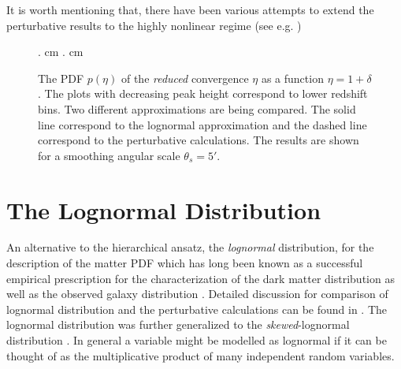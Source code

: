 \documentclass[usenatbib]{mn2e}
\begin{document}
It is worth mentioning that,
there have been various attempts to extend the perturbative results to the highly nonlinear
regime (see e.g. \citep{CBBH97,VaMu04})
%
\begin{figure}
\begin{center}
{. cm . cm
{}}
\end{center}
\caption{The PDF $p(\eta)$ of the {\em reduced} convergence $\eta$ as a function $\eta=1+\delta$. The plots
with decreasing peak height correspond to lower redshift bins. Two different approximations
are being compared. The solid line correspond to the lognormal approximation and the
dashed line correspond to the perturbative calculations. The results are shown for a smoothing
angular scale $\theta_s=5'$.}
\label{fig:eta_pdf}
\end{figure}
%
\section{The Lognormal Distribution}
\label{sec:logn}
%
An alternative to the hierarchical ansatz, the {\em lognormal} distribution, for the description
of the matter PDF which
has long been known as a successful 
empirical prescription for the characterization of the dark matter distribution as well as the
 observed galaxy distribution \citep{Ham85,CJ91,Bouchet93,Kf94}. Detailed discussion for comparison 
of lognormal distribution and the 
perturbative calculations can be found in \citep{BK95}. The lognormal distribution
was further generalized to the {\it skewed}-lognormal distribution \citep{Col94}. In general a
variable might be modelled as lognormal if it can be thought of as the multiplicative product of 
many independent random variables.
\end{document}
